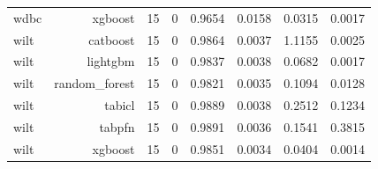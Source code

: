 \begin{table}[htbp]
\begin{tabular}{lrrrrrrr}
wdbc & xgboost & 15 & 0 & 0.9654 & 0.0158 & 0.0315 & 0.0017 \\
wilt & catboost & 15 & 0 & 0.9864 & 0.0037 & 1.1155 & 0.0025 \\
wilt & lightgbm & 15 & 0 & 0.9837 & 0.0038 & 0.0682 & 0.0017 \\
wilt & random\_forest & 15 & 0 & 0.9821 & 0.0035 & 0.1094 & 0.0128 \\
wilt & tabicl & 15 & 0 & 0.9889 & 0.0038 & 0.2512 & 0.1234 \\
wilt & tabpfn & 15 & 0 & 0.9891 & 0.0036 & 0.1541 & 0.3815 \\
wilt & xgboost & 15 & 0 & 0.9851 & 0.0034 & 0.0404 & 0.0014 \\
\hline
\end{tabular}
\end{table}
